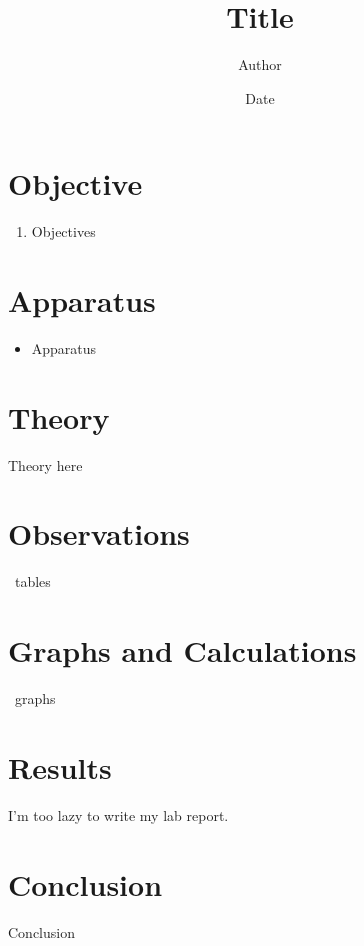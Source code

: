 \documentclass[a4paper]{article}
\title{\textbf{Title}}
\author{Author}
\date{Date}
\begin{document}
\maketitle



\section*{Objective}

\begin{enumerate}
	\item Objectives
\end{enumerate}



\section*{Apparatus}



\begin{itemize}
	\item Apparatus
\end{itemize}


\section*{Theory}

Theory here

\section*{Observations}

~tables~

\section*{Graphs and Calculations}

~graphs~


\section*{Results}

I'm too lazy to write my lab report.

\section*{Conclusion}

Conclusion
\end{document}
